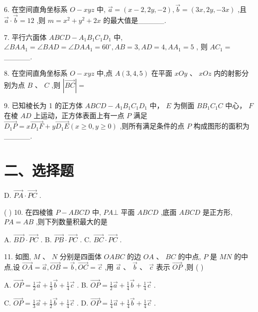 6. 在空间直角坐标系 $O - {xyz}$ 中, $\overrightarrow{a} = \left( {x - 2,{2y}, - 2}\right) ,\overrightarrow{b} = \left( {{3x},{2y}, - {3x}}\right)$ ,且 $\overrightarrow{a} \cdot  \overrightarrow{b} = {12}$ ,则 $m = {x}^{2} + {y}^{2}  + {2x}$ 的最大值是\_\_\_\_\_.

7. 平行六面体 ${ABCD} - {A}_{1}{B}_{1}{C}_{1}{D}_{1}$ 中, $\angle {BA}{A}_{1} = \angle {BAD} = \angle {DA}{A}_{1} = {60}^{ \circ  },{AB} = 3,{AD} = 4,A{A}_{1} = 5$ , 则 $A{C}_{1} =$ \_\_\_\_\_.

8. 在空间直角坐标系 $O - {xyz}$ 中,点 $A\left( {3,4,5}\right)$ 在平面 ${xOy}\text{ 、 }{xOz}$ 内的射影分别为点 $B\text{ 、 }C$ ,则 $\left| \overrightarrow{BC}\right|  =$

9. 已知棱长为 1 的正方体 ${ABCD} - {A}_{1}{B}_{1}{C}_{1}{D}_{1}$ 中， $E$ 为侧面 $B{B}_{1}{C}_{1}C$ 中心， $F$ 在棱 ${AD}$ 上运动，正方体表面上有一点 $P$ 满足 $\overrightarrow{{D}_{1}P} = x\overrightarrow{{D}_{1}F} + y\overrightarrow{{D}_{1}E}\left( {x \geq  0,y \geq  0}\right)$ ,则所有满足条件的点 $P$ 构成图形的面积为\_\_\_\_\_.

\section*{二、选择题}

D. $\overrightarrow{PA} \cdot  \overrightarrow{PC}$ .

( ) 10. 在四棱锥 $P - {ABCD}$ 中, ${PA} \bot$ 平面 ${ABCD}$ ,底面 ${ABCD}$ 是正方形, ${PA} = {AB}$ ,则下列数量积最大的是

A. $\overrightarrow{BD} \cdot  \overrightarrow{PC}$ . B. $\overrightarrow{PB} \cdot  \overrightarrow{PC}$ . C. $\overrightarrow{BC} \cdot  \overrightarrow{PC}$ .

11. 如图, $M\text{ 、 }N$ 分别是四面体 ${OABC}$ 的边 ${OA}\text{ 、 }{BC}$ 的中点, $P$ 是 ${MN}$ 的中点,设 $\overrightarrow{OA} = \overrightarrow{a},\overrightarrow{OB} = \overrightarrow{b},\overrightarrow{OC} =  \overrightarrow{c}$ ,用 $\overrightarrow{a}\text{ 、 }\overrightarrow{b}\text{ 、 }\overrightarrow{c}$ 表示 $\overrightarrow{OP}$ ,则 ( )

A. $\overrightarrow{OP} = \frac{1}{2}\overrightarrow{a} + \frac{1}{3}\overrightarrow{b} + \frac{1}{4}\overrightarrow{c}$ . B. $\overrightarrow{OP} = \frac{1}{2}\overrightarrow{a} + \frac{1}{4}\overrightarrow{b} + \frac{1}{4}\overrightarrow{c}$ .

C. $\overrightarrow{OP} = \frac{1}{3}\overrightarrow{a} + \frac{1}{2}\overrightarrow{b} + \frac{1}{4}\overrightarrow{c}$ . D. $\overrightarrow{OP} = \frac{1}{4}\overrightarrow{a} + \frac{1}{4}\overrightarrow{b} + \frac{1}{4}\overrightarrow{c}$ .

